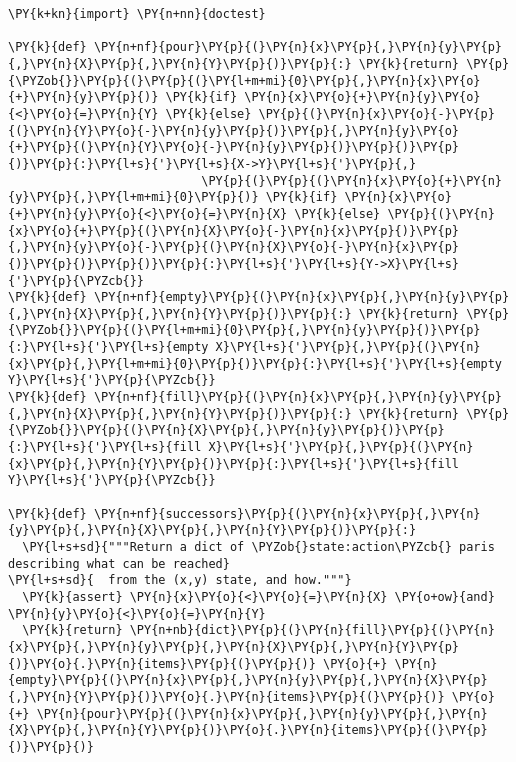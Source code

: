 \begin{Verbatim}[commandchars=\\\{\}]
\PY{k+kn}{import} \PY{n+nn}{doctest}

\PY{k}{def} \PY{n+nf}{pour}\PY{p}{(}\PY{n}{x}\PY{p}{,}\PY{n}{y}\PY{p}{,}\PY{n}{X}\PY{p}{,}\PY{n}{Y}\PY{p}{)}\PY{p}{:} \PY{k}{return} \PY{p}{\PYZob{}}\PY{p}{(}\PY{p}{(}\PY{l+m+mi}{0}\PY{p}{,}\PY{n}{x}\PY{o}{+}\PY{n}{y}\PY{p}{)} \PY{k}{if} \PY{n}{x}\PY{o}{+}\PY{n}{y}\PY{o}{<}\PY{o}{=}\PY{n}{Y} \PY{k}{else} \PY{p}{(}\PY{n}{x}\PY{o}{-}\PY{p}{(}\PY{n}{Y}\PY{o}{-}\PY{n}{y}\PY{p}{)}\PY{p}{,}\PY{n}{y}\PY{o}{+}\PY{p}{(}\PY{n}{Y}\PY{o}{-}\PY{n}{y}\PY{p}{)}\PY{p}{)}\PY{p}{)}\PY{p}{:}\PY{l+s}{'}\PY{l+s}{X->Y}\PY{l+s}{'}\PY{p}{,}
                           \PY{p}{(}\PY{p}{(}\PY{n}{x}\PY{o}{+}\PY{n}{y}\PY{p}{,}\PY{l+m+mi}{0}\PY{p}{)} \PY{k}{if} \PY{n}{x}\PY{o}{+}\PY{n}{y}\PY{o}{<}\PY{o}{=}\PY{n}{X} \PY{k}{else} \PY{p}{(}\PY{n}{x}\PY{o}{+}\PY{p}{(}\PY{n}{X}\PY{o}{-}\PY{n}{x}\PY{p}{)}\PY{p}{,}\PY{n}{y}\PY{o}{-}\PY{p}{(}\PY{n}{X}\PY{o}{-}\PY{n}{x}\PY{p}{)}\PY{p}{)}\PY{p}{)}\PY{p}{:}\PY{l+s}{'}\PY{l+s}{Y->X}\PY{l+s}{'}\PY{p}{\PYZcb{}}
\PY{k}{def} \PY{n+nf}{empty}\PY{p}{(}\PY{n}{x}\PY{p}{,}\PY{n}{y}\PY{p}{,}\PY{n}{X}\PY{p}{,}\PY{n}{Y}\PY{p}{)}\PY{p}{:} \PY{k}{return} \PY{p}{\PYZob{}}\PY{p}{(}\PY{l+m+mi}{0}\PY{p}{,}\PY{n}{y}\PY{p}{)}\PY{p}{:}\PY{l+s}{'}\PY{l+s}{empty X}\PY{l+s}{'}\PY{p}{,}\PY{p}{(}\PY{n}{x}\PY{p}{,}\PY{l+m+mi}{0}\PY{p}{)}\PY{p}{:}\PY{l+s}{'}\PY{l+s}{empty Y}\PY{l+s}{'}\PY{p}{\PYZcb{}}
\PY{k}{def} \PY{n+nf}{fill}\PY{p}{(}\PY{n}{x}\PY{p}{,}\PY{n}{y}\PY{p}{,}\PY{n}{X}\PY{p}{,}\PY{n}{Y}\PY{p}{)}\PY{p}{:} \PY{k}{return} \PY{p}{\PYZob{}}\PY{p}{(}\PY{n}{X}\PY{p}{,}\PY{n}{y}\PY{p}{)}\PY{p}{:}\PY{l+s}{'}\PY{l+s}{fill X}\PY{l+s}{'}\PY{p}{,}\PY{p}{(}\PY{n}{x}\PY{p}{,}\PY{n}{Y}\PY{p}{)}\PY{p}{:}\PY{l+s}{'}\PY{l+s}{fill Y}\PY{l+s}{'}\PY{p}{\PYZcb{}}

\PY{k}{def} \PY{n+nf}{successors}\PY{p}{(}\PY{n}{x}\PY{p}{,}\PY{n}{y}\PY{p}{,}\PY{n}{X}\PY{p}{,}\PY{n}{Y}\PY{p}{)}\PY{p}{:}
  \PY{l+s+sd}{"""Return a dict of \PYZob{}state:action\PYZcb{} paris describing what can be reached}
\PY{l+s+sd}{  from the (x,y) state, and how."""}
  \PY{k}{assert} \PY{n}{x}\PY{o}{<}\PY{o}{=}\PY{n}{X} \PY{o+ow}{and} \PY{n}{y}\PY{o}{<}\PY{o}{=}\PY{n}{Y}
  \PY{k}{return} \PY{n+nb}{dict}\PY{p}{(}\PY{n}{fill}\PY{p}{(}\PY{n}{x}\PY{p}{,}\PY{n}{y}\PY{p}{,}\PY{n}{X}\PY{p}{,}\PY{n}{Y}\PY{p}{)}\PY{o}{.}\PY{n}{items}\PY{p}{(}\PY{p}{)} \PY{o}{+} \PY{n}{empty}\PY{p}{(}\PY{n}{x}\PY{p}{,}\PY{n}{y}\PY{p}{,}\PY{n}{X}\PY{p}{,}\PY{n}{Y}\PY{p}{)}\PY{o}{.}\PY{n}{items}\PY{p}{(}\PY{p}{)} \PY{o}{+} \PY{n}{pour}\PY{p}{(}\PY{n}{x}\PY{p}{,}\PY{n}{y}\PY{p}{,}\PY{n}{X}\PY{p}{,}\PY{n}{Y}\PY{p}{)}\PY{o}{.}\PY{n}{items}\PY{p}{(}\PY{p}{)}\PY{p}{)}


\end{Verbatim}
